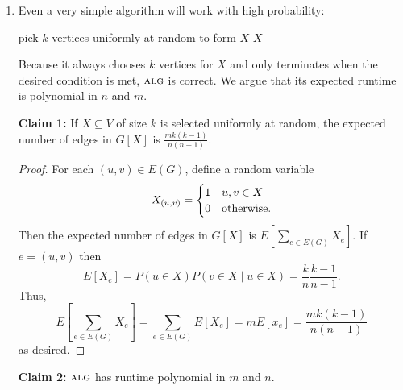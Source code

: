 \documentclass[11pt]{article}
\newcommand{\alg}{\textsc{alg}}
\begin{document}
\begin{enumerate}[(1)]
  \item Even a very simple algorithm will work with high probability:

    \begin{algorithm}
      \begin{algorithmic}
        \Loop
          \State pick $k$ vertices uniformly at random to form $X$
            \State \Return $X$
          \EndIf
        \EndLoop
        \EndFunction
      \end{algorithmic}
    \end{algorithm}

    Because it always chooses $k$ vertices for $X$ and only terminates when the desired condition is met, $\alg$ is correct.
    We argue that its expected runtime is polynomial in $n$ and $m$.

    {\bf Claim 1:} If $X \subseteq V$ of size $k$ is selected uniformly at random, the expected number of edges in $G[X]$ is $\frac{mk(k-1)}{n(n-1)}$.

    \begin{proof}
      For each $(u,v) \in E(G)$, define a random variable \[X_{(u,v)} = \begin{cases}1 & u, v \in X\\ 0 & \textnormal{otherwise}.\end{cases}\]
      Then the expected number of edges in $G[X]$ is $E\left[\sum_{e \in E(G)}X_e\right]$.
      If $e = (u,v)$ then \[E[X_e] = P(u \in X) P(v \in X \mid u \in X) = \frac{k}{n}\frac{k-1}{n-1}.\]
      Thus, \[E\left[\sum_{e \in E(G)}X_e\right] = \sum_{e \in E(G)} E[X_e] = mE[x_e] = \frac{mk(k-1)}{n(n-1)}\] as desired.
    \end{proof}

    {\bf Claim 2:} $\alg$ has runtime polynomial in $m$ and $n$.


\end{enumerate}
\end{document}
